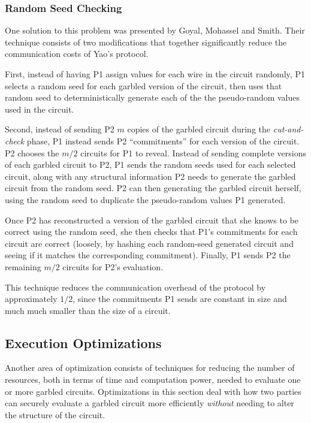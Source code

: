 \subsubsection{Random Seed Checking}
\label{sec:randomseed}

One solution to this problem was presented by Goyal, Mohassel and Smith\cite{goyal2008efficient}. Their technique consists of two modifications that together significantly reduce the communication costs of Yao's protocol.

First, instead of having \ac{P1} assign values for each wire in the circuit randomly, \ac{P1} selects a random seed for each garbled version of the circuit, then uses that random seed to deterministically generate each of the the pseudo-random values used in the circuit.

Second, instead of sending \ac{P2} $m$ copies of the garbled circuit during the \emph{cut-and-check} phase, \ac{P1} instead sends \ac{P2} ``commitments'' for each version of the circuit.  \ac{P2} chooses the $m/2$ circuits for \ac{P1} to reveal.  Instead of sending complete versions of each garbled circuit to \ac{P2}, \ac{P1} sends the random seeds used for each selected circuit, along with any structural information \ac{P2} needs to generate the garbled circuit from the random seed. \ac{P2} can then generating the garbled circuit herself, using the random seed to duplicate the pseudo-random values \ac{P1} generated.

Once \ac{P2} has reconstructed a version of the garbled circuit that she knows to be correct using the random seed, she then checks that \ac{P1}'s commitments for each circuit are correct (loosely, by hashing each random-seed generated circuit and seeing if it matches the corresponding commitment).  Finally, \ac{P1} sends \ac{P2} the remaining $m/2$ circuits for \ac{P2}'s evaluation.

This technique reduces the communication overhead of the protocol by approximately $1/2$, since the commitments \ac{P1} sends are constant in size and much much smaller than the size of a circuit.


\subsection{Execution Optimizations}

Another area of optimization consists of techniques for reducing the number of resources, both in terms of time and computation power, needed to evaluate one or more garbled circuits.  Optimizations in this section deal with how two parties can securely evaluate a garbled circuit more efficiently \emph{without} needing to alter the structure of the circuit.


